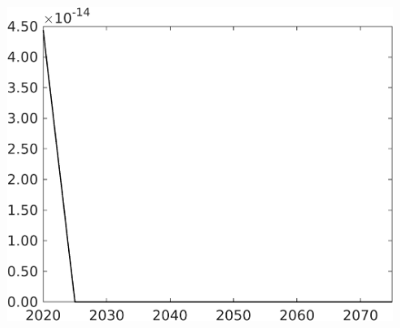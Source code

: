 \documentclass[12pt]{article}
\begin{document}
\begin{figure}[h!!]
\begin{minipage}[]{0.32\textwidth}
	\end{minipage}	
	\begin{minipage}[]{0.32\textwidth}
		\includegraphics[width=1\textwidth]{../../codding_model/own_basedOnFried/optimalPol_010922_revision/figures/all_13Sept22/CompTaufPER_bytaul_Reg0_F_spillover0_nsk1_xgr0_knspil0_sep0_LFlimit1_emsbase0_countec0_GovRev0_etaa0.79_lgd0.png}
	\end{minipage}	
\end{figure}


\clearpage \newpage
\end{document}

